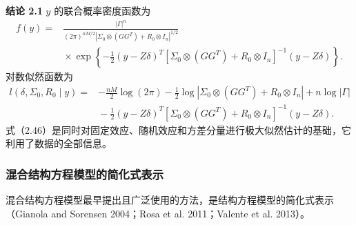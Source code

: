 \par\medskip\noindent\textbf{结论 2.1}\quad
$y$ 的联合概率密度函数为
\begin{equation}
\begin{aligned}
f(y)={}&\frac{|\Gamma|^n}{(2\pi)^{nM/2}
|\Sigma_0\otimes(GG^T)+R_0\otimes I_n|^{1/2}}\\
&{}\times\exp\left\{-\frac12(y-Z\delta)^T
[\Sigma_0\otimes(GG^T)+R_0\otimes I_n]^{-1}(y-Z\delta)\right\}.
\end{aligned}\tag{2.45}
\end{equation}
对数似然函数为
\begin{equation}
\begin{aligned}
l(\delta,\Sigma_0,R_0\mid y)
={}&-\frac{nM}2\log(2\pi)
-\frac12\log|\Sigma_0\otimes(GG^T)+R_0\otimes I_n|
+n\log|\Gamma|\\
&{}-\frac12(y-Z\delta)^T
[\Sigma_0\otimes(GG^T)+R_0\otimes I_n]^{-1}(y-Z\delta).
\end{aligned}\tag{2.46}
\end{equation}
式（2.46）是同时对固定效应、随机效应和方差分量进行极大似然估计的基础，它利用了数据的全部信息。

\subsubsection{混合结构方程模型的简化式表示}

混合结构方程模型最早提出且广泛使用的方法，是结构方程模型的简化式表示（Gianola and Sorensen 2004；Rosa et al. 2011；Valente et al. 2013）。

